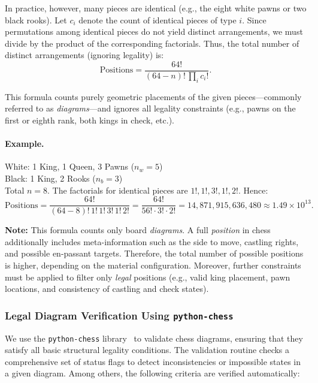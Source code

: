 \documentclass[12pt]{article}
\begin{document}
In practice, however, many pieces are identical (e.g., the eight white pawns or two black rooks).  
Let \(c_i\) denote the count of identical pieces of type \(i\).  
Since permutations among identical pieces do not yield distinct arrangements, we must divide by the product of the corresponding factorials.  
Thus, the total number of distinct arrangements (ignoring legality) is:
\[
\text{Positions} = \frac{64!}{(64 - n)! \, \prod_i c_i!}.
\]

This formula counts purely geometric placements of the given pieces—commonly referred to as \emph{diagrams}—and ignores all legality constraints (e.g., pawns on the first or eighth rank, both kings in check, etc.).

\paragraph{Example.}
White: 1 King, 1 Queen, 3 Pawns (\(n_w = 5\)) \\
Black: 1 King, 2 Rooks (\(n_b = 3\)) \\
Total \(n = 8\).  
The factorials for identical pieces are \(1!, 1!, 3!, 1!, 2!\).  
Hence:
\[
\text{Positions} = \frac{64!}{(64 - 8)! \, 1! \, 1! \, 3! \, 1! \, 2!}
= \frac{64!}{56! \cdot 3! \cdot 2!}
= 14{,}871{,}915{,}636{,}480 \approx 1.49 \times 10^{13}.
\]

\noindent
\textbf{Note:}  
This formula counts only board \emph{diagrams}.  
A full \emph{position} in chess additionally includes meta-information such as the side to move, castling rights, and possible en-passant targets.  
Therefore, the total number of possible positions is higher, depending on the material configuration.  
Moreover, further constraints must be applied to filter only \emph{legal} positions (e.g., valid king placement, pawn locations, and consistency of castling and check states).

\subsubsection{Legal Diagram Verification Using \texttt{python-chess}}

We use the \texttt{python-chess} library~\cite{python-chess} to validate chess diagrams, ensuring that they satisfy all basic structural legality conditions. 
The validation routine checks a comprehensive set of status flags to detect inconsistencies or impossible states in a given diagram. 
Among others, the following criteria are verified automatically:
\end{document}
